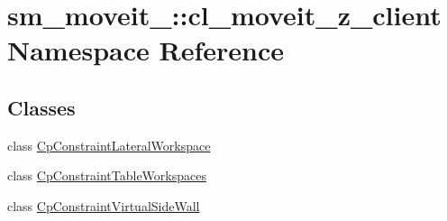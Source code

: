 \hypertarget{namespacesm__moveit__4_1_1cl__moveit__z__client}{}\section{sm\+\_\+moveit\+\_\+:\+:cl\+\_\+moveit\+\_\+z\+\_\+client Namespace Reference}
\label{namespacesm__moveit__4_1_1cl__moveit__z__client}
\subsection*{Classes}
\begin{DoxyCompactItemize}
\item 
class \hyperlink{classsm__moveit__4_1_1cl__moveit__z__client_1_1CpConstraintLateralWorkspace}{Cp\+Constraint\+Lateral\+Workspace}
\item 
class \hyperlink{classsm__moveit__4_1_1cl__moveit__z__client_1_1CpConstraintTableWorkspaces}{Cp\+Constraint\+Table\+Workspaces}
\item 
class \hyperlink{classsm__moveit__4_1_1cl__moveit__z__client_1_1CpConstraintVirtualSideWall}{Cp\+Constraint\+Virtual\+Side\+Wall}
\end{DoxyCompactItemize}
